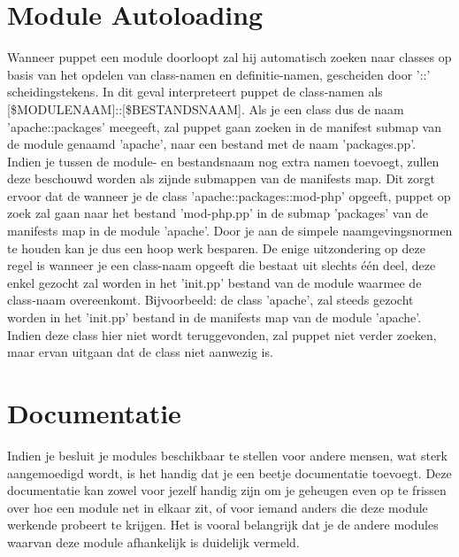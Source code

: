 \section{Module Autoloading}
Wanneer puppet een module doorloopt zal hij automatisch zoeken naar classes op basis van het opdelen van class-namen en definitie-namen, gescheiden door '::' scheidingstekens. In dit geval interpreteert puppet de class-namen als [\$MODULENAAM]::[\$BESTANDSNAAM]. Als je een class dus de naam 'apache::packages' meegeeft, zal puppet gaan zoeken in de manifest submap van de module genaamd 'apache', naar een bestand met de naam 'packages.pp'. Indien je tussen de module- en bestandsnaam nog extra namen toevoegt, zullen deze beschouwd worden als zijnde submappen van de manifests map. Dit zorgt ervoor dat de wanneer je de class 'apache::packages::mod-php' opgeeft, puppet op zoek zal gaan naar het bestand 'mod-php.pp' in de submap 'packages' van de manifests map in de module 'apache'. Door je aan de simpele naamgevingsnormen te houden kan je dus een hoop werk besparen. De enige uitzondering op deze regel is wanneer je een class-naam opgeeft die bestaat uit slechts \'e\'en deel, deze enkel gezocht zal worden in het 'init.pp' bestand van de module waarmee de class-naam overeenkomt. Bijvoorbeeld: de class 'apache', zal steeds gezocht worden in het 'init.pp' bestand in de manifests map van de module 'apache'. Indien deze class hier niet wordt teruggevonden, zal puppet niet verder zoeken, maar ervan uitgaan dat de class niet aanwezig is.

\section{Documentatie}
Indien je besluit je modules beschikbaar te stellen voor andere mensen, wat sterk aangemoedigd wordt, is het handig dat je een beetje documentatie toevoegt. Deze documentatie kan zowel voor jezelf handig zijn om je geheugen even op te frissen over hoe een module net in elkaar zit, of voor iemand anders die deze module werkende probeert te krijgen. Het is vooral belangrijk dat je de andere modules waarvan deze module afhankelijk is duidelijk vermeld.
%
